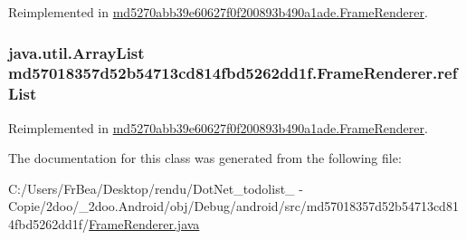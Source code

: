 Reimplemented in \hyperlink{classmd5270abb39e60627f0f200893b490a1ade_1_1_frame_renderer_c9ef5c3ae0c3ecaad8abeb4649d6a402}{md5270abb39e60627f0f200893b490a1ade.FrameRenderer}.\hypertarget{classmd57018357d52b54713cd814fbd5262dd1f_1_1_frame_renderer_f8ecb51614566d34e3a28877de382591}{
\subsubsection[{refList}]{\setlength{\rightskip}{0pt plus 5cm}java.util.ArrayList {\bf md57018357d52b54713cd814fbd5262dd1f.FrameRenderer.refList}}}
\label{classmd57018357d52b54713cd814fbd5262dd1f_1_1_frame_renderer_f8ecb51614566d34e3a28877de382591}




Reimplemented in \hyperlink{classmd5270abb39e60627f0f200893b490a1ade_1_1_frame_renderer_5ed9d00ee3a9f50c03b3bde2a352e936}{md5270abb39e60627f0f200893b490a1ade.FrameRenderer}.

The documentation for this class was generated from the following file:\begin{CompactItemize}
\item 
C:/Users/FrBea/Desktop/rendu/DotNet\_\-todolist\_ - Copie/2doo/\_\-2doo.Android/obj/Debug/android/src/md57018357d52b54713cd814fbd5262dd1f/\hyperlink{md57018357d52b54713cd814fbd5262dd1f_2_frame_renderer_8java}{FrameRenderer.java}\end{CompactItemize}
